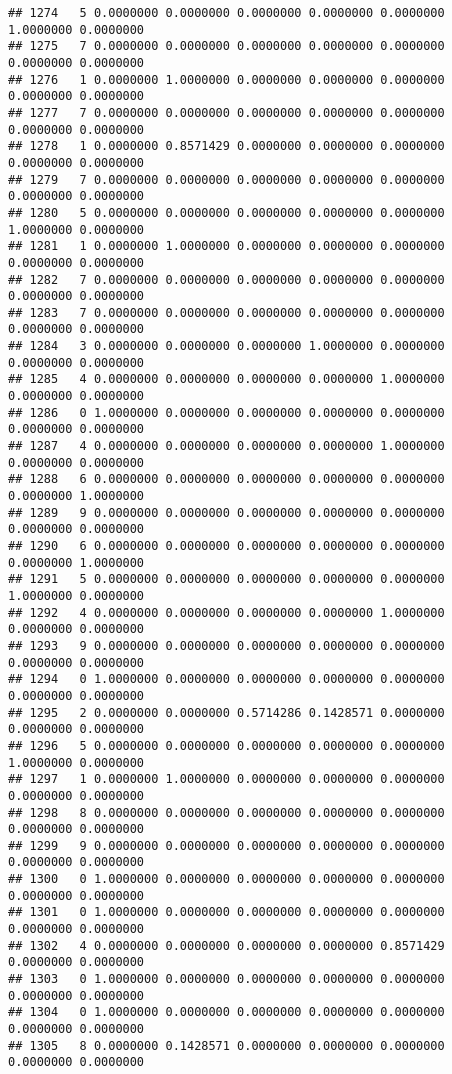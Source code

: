 \documentclass[
]{article}
\begin{document}
\begin{verbatim}
## 1274   5 0.0000000 0.0000000 0.0000000 0.0000000 0.0000000 1.0000000 0.0000000
## 1275   7 0.0000000 0.0000000 0.0000000 0.0000000 0.0000000 0.0000000 0.0000000
## 1276   1 0.0000000 1.0000000 0.0000000 0.0000000 0.0000000 0.0000000 0.0000000
## 1277   7 0.0000000 0.0000000 0.0000000 0.0000000 0.0000000 0.0000000 0.0000000
## 1278   1 0.0000000 0.8571429 0.0000000 0.0000000 0.0000000 0.0000000 0.0000000
## 1279   7 0.0000000 0.0000000 0.0000000 0.0000000 0.0000000 0.0000000 0.0000000
## 1280   5 0.0000000 0.0000000 0.0000000 0.0000000 0.0000000 1.0000000 0.0000000
## 1281   1 0.0000000 1.0000000 0.0000000 0.0000000 0.0000000 0.0000000 0.0000000
## 1282   7 0.0000000 0.0000000 0.0000000 0.0000000 0.0000000 0.0000000 0.0000000
## 1283   7 0.0000000 0.0000000 0.0000000 0.0000000 0.0000000 0.0000000 0.0000000
## 1284   3 0.0000000 0.0000000 0.0000000 1.0000000 0.0000000 0.0000000 0.0000000
## 1285   4 0.0000000 0.0000000 0.0000000 0.0000000 1.0000000 0.0000000 0.0000000
## 1286   0 1.0000000 0.0000000 0.0000000 0.0000000 0.0000000 0.0000000 0.0000000
## 1287   4 0.0000000 0.0000000 0.0000000 0.0000000 1.0000000 0.0000000 0.0000000
## 1288   6 0.0000000 0.0000000 0.0000000 0.0000000 0.0000000 0.0000000 1.0000000
## 1289   9 0.0000000 0.0000000 0.0000000 0.0000000 0.0000000 0.0000000 0.0000000
## 1290   6 0.0000000 0.0000000 0.0000000 0.0000000 0.0000000 0.0000000 1.0000000
## 1291   5 0.0000000 0.0000000 0.0000000 0.0000000 0.0000000 1.0000000 0.0000000
## 1292   4 0.0000000 0.0000000 0.0000000 0.0000000 1.0000000 0.0000000 0.0000000
## 1293   9 0.0000000 0.0000000 0.0000000 0.0000000 0.0000000 0.0000000 0.0000000
## 1294   0 1.0000000 0.0000000 0.0000000 0.0000000 0.0000000 0.0000000 0.0000000
## 1295   2 0.0000000 0.0000000 0.5714286 0.1428571 0.0000000 0.0000000 0.0000000
## 1296   5 0.0000000 0.0000000 0.0000000 0.0000000 0.0000000 1.0000000 0.0000000
## 1297   1 0.0000000 1.0000000 0.0000000 0.0000000 0.0000000 0.0000000 0.0000000
## 1298   8 0.0000000 0.0000000 0.0000000 0.0000000 0.0000000 0.0000000 0.0000000
## 1299   9 0.0000000 0.0000000 0.0000000 0.0000000 0.0000000 0.0000000 0.0000000
## 1300   0 1.0000000 0.0000000 0.0000000 0.0000000 0.0000000 0.0000000 0.0000000
## 1301   0 1.0000000 0.0000000 0.0000000 0.0000000 0.0000000 0.0000000 0.0000000
## 1302   4 0.0000000 0.0000000 0.0000000 0.0000000 0.8571429 0.0000000 0.0000000
## 1303   0 1.0000000 0.0000000 0.0000000 0.0000000 0.0000000 0.0000000 0.0000000
## 1304   0 1.0000000 0.0000000 0.0000000 0.0000000 0.0000000 0.0000000 0.0000000
## 1305   8 0.0000000 0.1428571 0.0000000 0.0000000 0.0000000 0.0000000 0.0000000

\end{verbatim}
\end{document}
